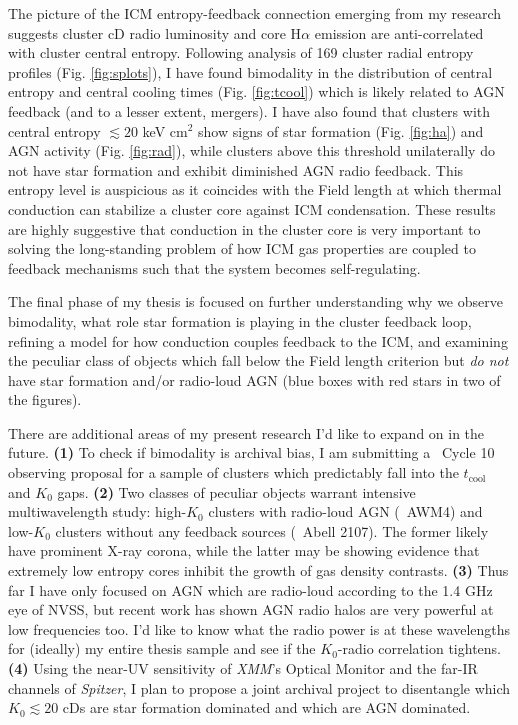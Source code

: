 \documentclass[11pt]{article}
\begin{document}
The picture of the ICM entropy-feedback connection emerging from my
research suggests cluster cD radio luminosity and core H$\alpha$
emission are anti-correlated with cluster central entropy. Following
analysis of 169 cluster radial entropy profiles
(Fig. \ref{fig:splots}), I have found bimodality in the distribution
of central entropy and central cooling times (Fig. \ref{fig:tcool})
which is likely related to AGN feedback (and to a lesser extent,
mergers). I have also found that clusters with central entropy
$\lesssim 20$ keV cm$^2$ show signs of star formation
(Fig. \ref{fig:ha}) and AGN activity (Fig. \ref{fig:rad}), while
clusters above this threshold unilaterally do not have star formation
and exhibit diminished AGN radio feedback. This entropy level is
auspicious as it coincides with the Field length at which thermal
conduction can stabilize a cluster core against ICM
condensation. These results are highly suggestive that conduction in
the cluster core is very important to solving the long-standing
problem of how ICM gas properties are coupled to feedback mechanisms
such that the system becomes self-regulating.

The final phase of my thesis is focused on further understanding why
we observe bimodality, what role star formation is playing in the cluster
feedback loop, refining a model for how conduction couples feedback to
the ICM, and examining the peculiar class of objects which fall below
the Field length criterion but {\it do not} have star formation and/or
radio-loud AGN (blue boxes with red stars in two of the figures).

There are additional areas of my present research I'd like to expand
on in the future. {\bf(1)} To check if bimodality is archival bias, I am
submitting a \Chandra\ Cycle 10 observing proposal for a sample of
clusters which predictably fall into the $t_{\mathrm{cool}}$ and $K_0$
gaps. {\bf(2)} Two classes of peculiar objects warrant intensive
multiwavelength study: high-$K_0$ clusters with radio-loud AGN
(\eg\ AWM4) and low-$K_0$ clusters without any feedback sources
(\eg\ Abell 2107). The former likely have prominent X-ray corona,
while the latter may be showing evidence that extremely low entropy
cores inhibit the growth of gas density contrasts. {\bf(3)} Thus far I have
only focused on AGN which are radio-loud according to the 1.4 GHz eye
of NVSS, but recent work has shown AGN radio halos are very powerful
at low frequencies too. I'd like to know what the radio power is at
these wavelengths for (ideally) my entire thesis sample and see if the
$K_0$-radio correlation tightens. {\bf(4)} Using the near-UV sensitivity of
{\it XMM}'s Optical Monitor and the far-IR channels of {\it Spitzer},
I plan to propose a joint archival project to disentangle which $K_0
\lesssim 20$ cDs are star formation dominated and which are AGN
dominated. 
\end{document}
